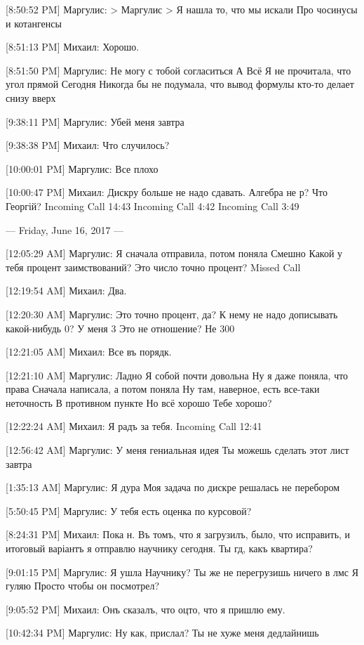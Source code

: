 \documentclass{article}
\newcommand{\yat}{{\fontencoding{X2}\selectfont\cyryat}} %
\begin{document}
[8:50:52 PM] Маргулис:
> Маргулис
> Я нашла то, что мы искали
Про чосинусы и котангенсы

[8:51:13 PM] Михаил:
Хорошо.

[8:51:50 PM] Маргулис:
Не могу с тобой согласиться
 А
 Всё
 Я не прочитала, что угол прямой
 Сегодня
 Никогда бы не подумала, что вывод формулы кто-то делает снизу вверх

[9:38:11 PM] Маргулис:
Убей меня завтра

[9:38:38 PM] Михаил:
Что случилось?

[10:00:01 PM] Маргулис:
Все плохо

[10:00:47 PM] Михаил:
Дискру больше не надо сдавать.
 Алгебра не р?
 Что Георгій?
Incoming Call 14:43
Incoming Call 4:42
Incoming Call 3:49

--- Friday, June 16, 2017 ---

[12:05:29 AM] Маргулис:
Я сначала отправила, потом поняла
 Смешно
 Какой у тебя процент заимствований?
 Это число точно процент?
Missed Call

[12:19:54 AM] Михаил:
Два.

[12:20:30 AM] Маргулис:
Это точно процент, да? К нему не надо дописывать какой-нибудь 0?
 У меня 3
 Это не отношение? Не 300%

[12:21:05 AM] Михаил:
Все въ порядк\yat.

[12:21:10 AM] Маргулис:
Ладно
 Я собой почти довольна
 Ну я даже поняла, что права
 Сначала написала, а потом поняла
 Ну там, наверное, есть все-таки неточность
 В противном пункте
 Но всё хорошо
 Тебе хорошо?

[12:22:24 AM] Михаил:
Я радъ за тебя.
Incoming Call 12:41

[12:56:42 AM] Маргулис:
У меня гениальная идея
 Ты можешь сделать этот лист завтра

[1:35:13 AM] Маргулис:
Я дура
 Моя задача по дискре решалась не перебором

[5:50:45 PM] Маргулис:
У тебя есть оценка по курсовой?

[8:24:31 PM] Михаил:
Пока н. Въ томъ, что я загрузилъ, было, что исправить, и итоговый варіантъ я отправлю научнику сегодня.
 Ты гд\yat, какъ квартира?

[9:01:15 PM] Маргулис:
Я ушла
 Научнику?
 Ты же не перегрузишь ничего в лмс
 Я гуляю
 Просто чтобы он посмотрел?

[9:05:52 PM] Михаил:
Онъ сказалъ, что оц то, что я пришлю ему.

[10:42:34 PM] Маргулис:
Ну как, прислал?
 Ты не хуже меня дедлайнишь
\end{document}
